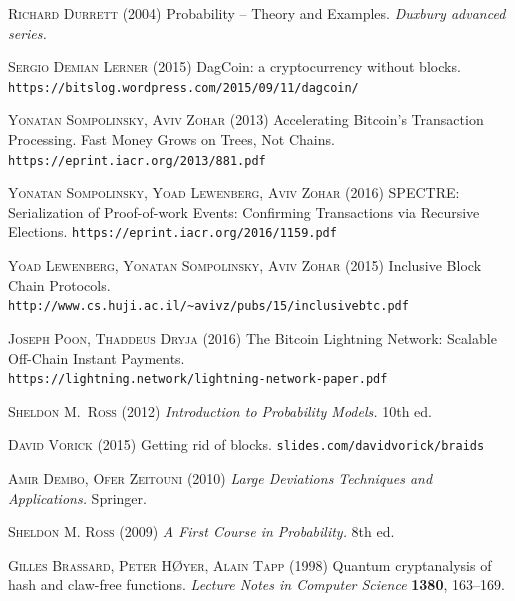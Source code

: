 \documentclass[12pt]{article}
\begin{document}
\begin{CJK}{UTF8}{bkai}
\begin{thebibliography}{9}
 \textsc{Richard Durrett} (2004)
Probability -- Theory and Examples.
\textit{Duxbury advanced series.}


 \textsc{Sergio Demian Lerner} (2015)
DagCoin: a cryptocurrency without blocks.
\texttt{https://bitslog.wordpress.com/2015/09/11/dagcoin/}

 \textsc{Yonatan Sompolinsky, Aviv Zohar} (2013)
Accelerating Bitcoin's Transaction Processing.
Fast Money Grows on Trees, Not Chains.
\texttt{https://eprint.iacr.org/2013/881.pdf}

 \textsc{Yonatan Sompolinsky, Yoad Lewenberg, Aviv Zohar} (2016)
SPECTRE:
Serialization of Proof-of-work Events: Confirming Transactions via
Recursive Elections.
\texttt{https://eprint.iacr.org/2016/1159.pdf}

 \textsc{Yoad Lewenberg, Yonatan Sompolinsky, Aviv Zohar} 
(2015)
Inclusive Block Chain Protocols.\\
\texttt{http://www.cs.huji.ac.il/\textasciitilde{}avivz/pubs/15/inclusive\underline{\phantom{m}}btc.pdf}

\textsc{Joseph Poon, Thaddeus Dryja} (2016)
The Bitcoin Lightning Network:
Scalable Off-Chain Instant Payments.\\
\texttt{https://lightning.network/lightning-network-paper.pdf}

 \textsc{Sheldon M.\ Ross} (2012) 
\textit{Introduction to Probability Models.} 10th ed.

\textsc{David Vorick} (2015)
Getting rid of blocks.
\texttt{slides.com/davidvorick/braids}


\textsc{Amir Dembo, Ofer Zeitouni} (2010)
\textit{Large Deviations Techniques and Applications.}
Springer.

 \textsc{Sheldon M. Ross} (2009) 
\textit{A First Course in Probability.} 8th ed.

 \textsc{Gilles Brassard, Peter HØyer, Alain Tapp} (1998)
Quantum cryptanalysis of hash and claw-free functions.
\textit{Lecture Notes in Computer Science} \textbf{1380},
163--169.


\end{thebibliography}
\end{CJK}
\end{document}
